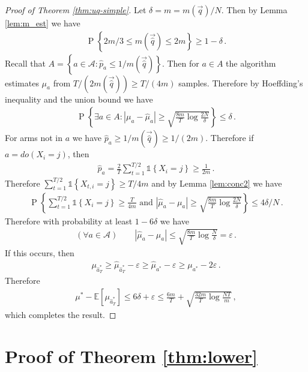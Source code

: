 \documentclass{article}
\newcommand{\set}[1]{\left\{#1\right\}}
\newcommand{\ind}[1]{\mathds{1}\!\!\set{#1}}
\newcommand{\eq}[1]{\begin{align*}#1\end{align*}}
\renewcommand{\P}[1]{\operatorname{P}\left\{#1\right\}}
\newcommand{\EE}{\mathbb E}
\newcommand{\actions}{\mathcal{A}}
\theoremstyle{plain}
\theoremstyle{definition}
\let\epsilon\varepsilon
\begin{document}
\begin{proof}[Proof of Theorem \ref{thm:uq-simple}]
Let $\delta = m = m(\vec{q}) / N$. Then by Lemma \ref{lem:m_est} we have 
\eq{
\P{2m/3 \leq m(\vec{\hat q}) \leq 2m} \geq 1 - \delta\,.
}
Recall that $A = \set{a \in \actions : \hat p_a \leq 1/m(\vec{\hat q})}$. Then
for $a \in A$ the algorithm estimates $\mu_a$ from $T/(2m(\vec{\hat q})) \geq T/(4m)$ samples.
Therefore by Hoeffding's inequality and the union bound we have
\eq{
\P{\exists a \in A : |\mu_a - \hat \mu_a| \geq \sqrt{\frac{8m}{T} \log\frac{2N}{\delta}}} \leq \delta\,.
}
For arms not in $a$ we have $\hat p_a \geq 1/m(\vec{\hat q}) \geq 1/(2m)$.
Therefore if $a = do(X_i = j)$, then 
\eq{
\hat p_a = \frac{2}{T} \sum_{t=1}^{T/2} \ind{X_i = j} \geq \frac{1}{2m}\,. 
}
Therefore $\sum_{t=1}^{T/2} \ind{X_{t,i} = j} \geq T/4m$
and by Lemma \ref{lem:conc2} we have
\eq{
\P{\sum_{t=1}^{T/2} \ind{X_i = j} \geq \frac{T}{4m} \text{ and } \left|\hat \mu_a - \mu_a\right| \geq \sqrt{\frac{8m}{T} \log \frac{2N}{\delta}}} \leq 4\delta / N\,.
}
Therefore with probability at least $1 - 6\delta$ we have
\eq{
(\forall a \in \actions) \qquad |\hat \mu_a - \mu_a| \leq \sqrt{\frac{8m}{T} \log \frac{N}{\delta}} = \epsilon\,.
}
If this occurs, then 
\eq{
\mu_{\hat a^*_T} \geq \hat \mu_{\hat a^*_T} - \epsilon \geq \hat \mu_{a^*} - \epsilon \geq \mu_{a^*} - 2\epsilon\,.
}
Therefore
\eq{
\mu^* - \EE[\mu_{\hat a^*_T}] 
\leq 6\delta + \epsilon 
\leq \frac{6m}{T} + \sqrt{\frac{32m}{T} \log \frac{NT}{m}}\,, 
}
which completes the result.
\end{proof}

\section{Proof of Theorem \ref{thm:lower}}\label{sec:thm:lower}
\end{document}
